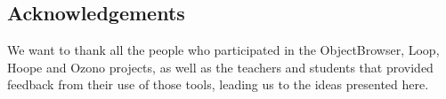 \documentclass[preprint,10pt,nocopyrightspace]{sigplanconf}
\begin{document}



\subsection{Acknowledgements}
We want to thank all the people who participated in the ObjectBrowser, Loop, Hoope and Ozono projects, 
as well as the teachers and students that provided feedback from their use of those tools, leading us to the ideas presented here.

{
\small


}


\end{document}
